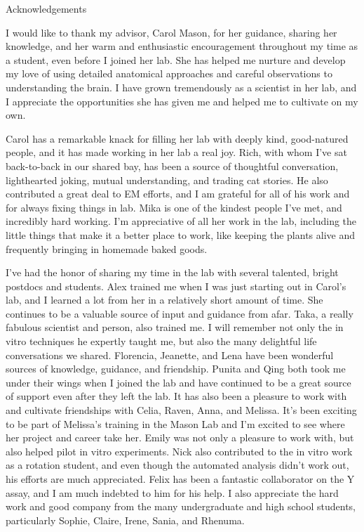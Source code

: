 {\centering
\LARGE
Acknowledgements
\par
}

I would like to thank my advisor, Carol Mason, for her guidance, sharing her knowledge, and her warm and enthusiastic encouragement throughout my time as a student, even before I joined her lab.
She has helped me nurture and develop my love of using detailed anatomical approaches and careful observations to understanding the brain.
I have grown tremendously as a scientist in her lab, and I appreciate the opportunities she has given me and helped me to cultivate on my own.

Carol has a remarkable knack for filling her lab with deeply kind, good-natured people, and it has made working in her lab a real joy.
Rich, with whom I've sat back-to-back in our shared bay, has been a source of thoughtful conversation, lighthearted joking, mutual understanding, and trading cat stories.
He also contributed a great deal to EM efforts, and I am grateful for all of his work and for always fixing things in lab.
Mika is one of the kindest people I've met, and incredibly hard working.
I'm appreciative of all her work in the lab, including the little things that make it a better place to work, like keeping the plants alive and frequently bringing in homemade baked goods.

I've had the honor of sharing my time in the lab with several talented, bright postdocs and students.
Alex trained me when I was just starting out in Carol's lab, and I learned a lot from her in a relatively short amount of time.
She continues to be a valuable source of input and guidance from afar.
Taka, a really fabulous scientist and person, also trained me.
I will remember not only the in vitro techniques he expertly taught me, but also the many delightful life conversations we shared.
Florencia, Jeanette, and Lena have been wonderful sources of knowledge, guidance, and friendship.
Punita and Qing both took me under their wings when I joined the lab and have continued to be a great source of support even after they left the lab.
It has also been a pleasure to work with and cultivate friendships with Celia, Raven, Anna, and Melissa.
It's been exciting to be part of Melissa's training in the Mason Lab and I'm excited to see where her project and career take her.
Emily was not only a pleasure to work with, but also helped pilot in vitro experiments.
Nick also contributed to the in vitro work as a rotation student, and even though the automated analysis didn't work out, his efforts are much appreciated.
Felix has been a fantastic collaborator on the Y assay, and I am much indebted to him for his help.
I also appreciate the hard work and good company from the many undergraduate and high school students, particularly Sophie, Claire, Irene, Sania, and Rhenuma.


